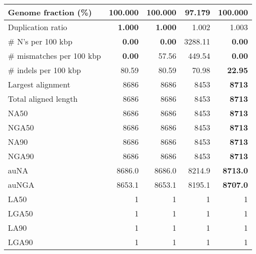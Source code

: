 \documentclass[12pt,a4paper]{article}
\begin{document}
\begin{table}[ht]
\begin{center}
\begin{tabular}{|l*{4}{|r}|}
Genome fraction (\%) & {\bf 100.000} & {\bf 100.000} & 97.179 & {\bf 100.000} \\ \hline
Duplication ratio & {\bf 1.000} & {\bf 1.000} & 1.002 & 1.003 \\ \hline
\# N's per 100 kbp & {\bf 0.00} & {\bf 0.00} & 3288.11 & {\bf 0.00} \\ \hline
\# mismatches per 100 kbp & {\bf 0.00} & 57.56 & 449.54 & {\bf 0.00} \\ \hline
\# indels per 100 kbp & 80.59 & 80.59 & 70.98 & {\bf 22.95} \\ \hline
Largest alignment & 8686 & 8686 & 8453 & {\bf 8713} \\ \hline
Total aligned length & 8686 & 8686 & 8453 & {\bf 8713} \\ \hline
NA50 & 8686 & 8686 & 8453 & {\bf 8713} \\ \hline
NGA50 & 8686 & 8686 & 8453 & {\bf 8713} \\ \hline
NA90 & 8686 & 8686 & 8453 & {\bf 8713} \\ \hline
NGA90 & 8686 & 8686 & 8453 & {\bf 8713} \\ \hline
auNA & 8686.0 & 8686.0 & 8214.9 & {\bf 8713.0} \\ \hline
auNGA & 8653.1 & 8653.1 & 8195.1 & {\bf 8707.0} \\ \hline
LA50 & 1 & 1 & 1 & 1 \\ \hline
LGA50 & 1 & 1 & 1 & 1 \\ \hline
LA90 & 1 & 1 & 1 & 1 \\ \hline
LGA90 & 1 & 1 & 1 & 1 \\ \hline
\end{tabular}
\end{center}
\end{table}
\end{document}
